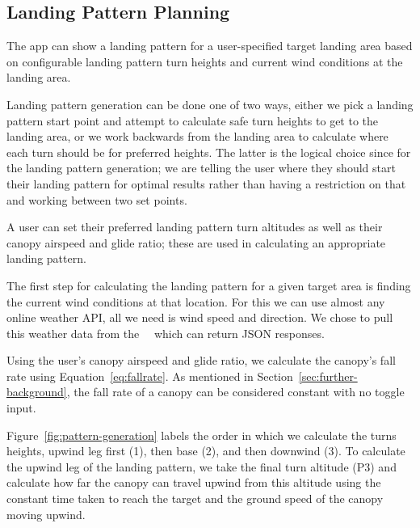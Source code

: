 \subsection{Landing Pattern Planning}\label{subsec:landing-pattern}
The app can show a landing pattern for a user-specified target landing area based on configurable landing pattern turn heights and current wind conditions at the landing area.

Landing pattern generation can be done one of two ways, either we pick a landing pattern start point and attempt to calculate safe turn heights to get to the landing area, or we work backwards from the landing area to calculate where each turn should be for preferred heights. The latter is the logical choice since for the landing pattern generation; we are telling the user where they should start their landing pattern for optimal results rather than having a restriction on that and working between two set points.

A user can set their preferred landing pattern turn altitudes as well as their canopy airspeed and glide ratio; these are used in calculating an appropriate landing pattern.

The first step for calculating the landing pattern for a given target area is finding the current wind conditions at that location. For this we can use almost any online weather API, all we need is wind speed and direction. We chose to pull this weather data from the~~\cite{openweathermap_openweathermap_????} which can return JSON responses.

Using the user's canopy airspeed and glide ratio, we calculate the canopy's fall rate using Equation~\vref{eq:fallrate}. As mentioned in Section~\ref{sec:further-background}, the fall rate of a canopy can be considered constant with no toggle input.

Figure~\vref{fig:pattern-generation} labels the order in which we calculate the turns heights, upwind leg first (1), then base (2), and then downwind (3).
To calculate the upwind leg of the landing pattern, we take the final turn altitude (P3) and calculate how far the canopy can travel upwind from this altitude using the constant time taken to reach the target and the ground speed of the canopy moving upwind.

